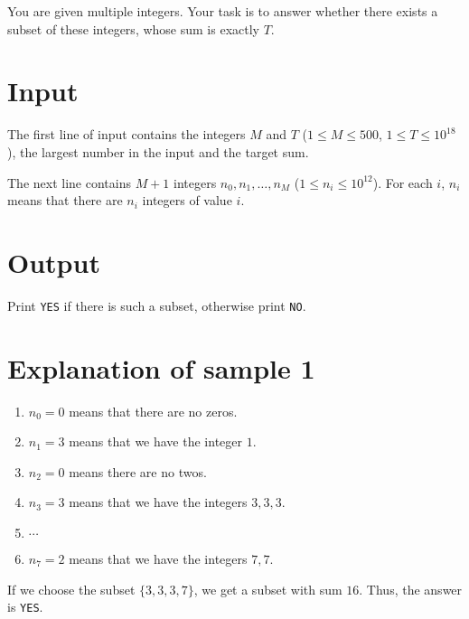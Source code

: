 You are given multiple integers. Your task is to answer whether there exists a subset of these integers, whose
sum is exactly $T$.

\section*{Input}
The first line of input contains the integers $M$ and $T$ ($1 \leq M \leq 500$, $1 \leq T \leq 10^{18}$),
the largest number in the input and the target sum.

The next line contains $M+1$ integers $n_0, n_1, \dots, n_M$ ($1 \leq n_i \leq 10^{12}$). For each $i$,
$n_i$ means that there are $n_i$ integers of value $i$.

\section*{Output}
Print \texttt{YES} if there is such a subset, otherwise print \texttt{NO}.

\section*{Explanation of sample 1}
\begin{enumerate}
  \item $n_0=0$ means that there are no zeros.
  \item $n_1=3$ means that we have the integer $1$.
  \item $n_2=0$ means there are no twos.
  \item $n_3=3$ means that we have the integers $3,3,3$.
  \item $\cdots$
  \item $n_7=2$ means that we have the integers $7,7$.
\end{enumerate}

If we choose the subset $\{3,3,3,7\}$, we get a subset with sum $16$. Thus, the answer is \texttt{YES}.
